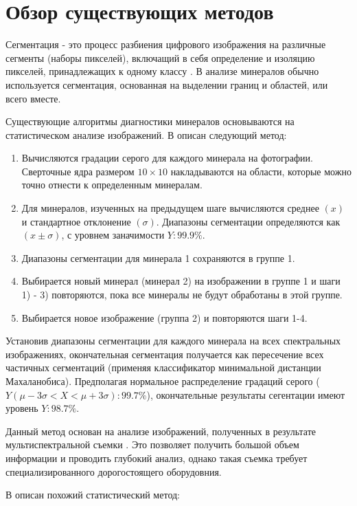 \section{Обзор существующих методов}
Сегментация - это процесс разбиения цифрового изображения на различные сегменты (наборы пикселей), включащий в себя
определение и изоляцию пикселей, принадлежащих к одному классу \cite{martinez2007petrographic}.
В анализе минералов обычно используется сегментация, основанная на выделении границ и областей, или всего вместе. \par
Существующие алгоритмы диагностики минералов основываются на статистическом анализе изображений.
В \cite{berrezueta2016ore} описан следующий метод:
\begin{enumerate}[nosep]
    \item Вычисляются градации серого для каждого минерала на фотографии. Сверточные ядра размером $10\times 10$ накладываются на области, которые можно точно отнести к определенным минералам.
    \item Для минералов, изученных на предыдущем шаге вычисляются среднее $(x)$ и стандартное отклонение $(\sigma)$. Диапазоны сегментации определяются как $(x \pm \sigma)$, с уровнем заначимости $Y: 99.9\%$.
    \item Диапазоны сегментации для минерала 1 сохраняются в группе 1.
    \item Выбирается новый минерал (минерал 2) на изображении в группе 1 и шаги 1) - 3) повторяются, пока все минералы не будут обработаны в этой группе.
    \item Выбирается новое изображение (группа 2) и повторяются шаги 1-4.
\end{enumerate}
\par Установив диапазоны сегментации для каждого минерала на всех спектральных изображениях, окончательная сегментация получается как пересечение всех частичных сегментаций (применяя классификатор минимальной дистанции Махаланобиса). Предполагая нормальное распределение градаций серого ($Y(\mu -3\sigma < X < \mu +3\sigma):99.7\%$), окончательные результаты сегентации имеют уровень $Y: 98.7\%$.
\par Данный метод основан на анализе изображений, полученных в результате мультиспектральной съемки \cite{catalina2009use, barnuevo2008ensayo}. Это позволяет получить большой объем информации и проводить глубокий анализ, однако такая съемка требует специализированного дорогостоящего оборудовния.
\par В \cite{kose2012statistical} описан похожий статистический метод:
